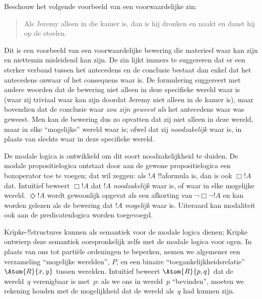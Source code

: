 \documentclass[openany]{memoir}
\begin{document}
\begingroup
\def\olfilename{OLP-0180}
\def\olfilepath{content/first-order-logic/beyond/}
\hypertarget{unit-OLP-0180}{}





Beschouw het volgende voorbeeld van een voorwaardelijke zin:
\begin{quote}
  Als Jeremy alleen in die kamer is, dan is hij dronken en naakt en
  danst hij op de stoelen.
\end{quote}
Dit is een voorbeeld van een voorwaardelijke bewering die materieel waar kan
zijn en niettemin misleidend kan zijn. De zin lijkt immers te suggereren dat er
een sterker verband tussen het antecedens en de conclusie bestaat dan enkel dat
het antecedens onwaar of het consequens waar is. De formulering suggereert met
andere woorden dat de bewering niet alleen in deze specifieke wereld waar is
(waar zij triviaal waar kan zijn doordat Jeremy niet alleen in de kamer is),
maar bovendien dat de conclusie waar \emph{zou zijn geweest} \emph{als} het
antecedens waar was geweest. Men kan de bewering dus zo opvatten dat zij niet
alleen in deze wereld, maar in elke ``mogelijke'' wereld waar is; ofwel dat zij
\emph{noodzakelijk} waar is, in plaats van slechts waar in deze specifieke
wereld.

De modale logica is ontwikkeld om dit soort noodzakelijkheid te duiden. De
modale propositielogica ontstaat door aan de gewone propositielogica een
boxoperator toe te voegen; dat wil zeggen: als $!A$ !!a{formula} is, dan is ook
$\Box !A$ dat. Intuïtief beweert $\Box !A$ dat $!A$ \emph{noodzakelijk} waar is,
of waar in elke mogelijke wereld. $\Diamond !A$ wordt gewoonlijk opgevat als
een afkorting van $\lnot \Box \lnot !A$ en kan worden gelezen als de bewering
dat $!A$ \emph{mogelijk} waar is. Uiteraard kan modaliteit ook aan de
predicatenlogica worden toegevoegd.

Kripke-!!{structure}s kunnen als semantiek voor de modale logica dienen; Kripke
ontwierp deze semantiek oorspronkelijk zelfs met de modale logica voor ogen. In
plaats van ons tot partiële ordeningen te beperken, nemen we algemener een
verzameling ``mogelijke werelden'', $P$, en een binaire
``toegankelijkheidsrelatie'' $\Atom{R}{x,y}$ tussen werelden. Intuïtief beweert
$\Atom{R}{p,q}$ dat de wereld~$q$ verenigbaar is met~$p$: als we ons in
wereld~$p$ ``bevinden'', moeten we rekening houden met de mogelijkheid dat de
wereld als~$q$ had kunnen zijn.
\end{document}
